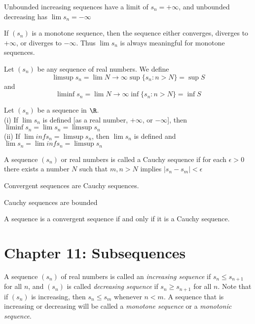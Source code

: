 \documentclass[twoside, 10pt]{article}
\begin{document}
\begin{thm}
Unbounded increasing sequences have a limit of $s_n = +\infty$, and unbounded decreasing has $\lim s_n = -\infty$
\end{thm}

\begin{cor}
If $(s_n)$ is a monotone sequence, then the sequence either converges, diverges to $+\infty$, or diverges to $-\infty$. Thus $\lim s_n$ is always meaningful for monotone sequences.
\end{cor}

\begin{defn}
Let $(s_n)$ be any sequence of real numbers. We define \begin{equation*}
    \limsup{s_n} = \lim\limits{N \to \infty} \sup \{s_n: n > N\} = \sup S
\end{equation*}
and 
\begin{equation*}
    \liminf{s_n} = \lim\limits{N \to \infty} \inf\{s_n : n > N\} = \inf S
\end{equation*}
\end{defn}

\begin{thm}
Let $(s_n)$ be a sequence in $\R$.\\
(i) If $\lim s_n$ is defined [as a real number, $+\infty$, or $-\infty$], then $\liminf s_n = \lim s_n = \limsup s_n$\\
(ii) If $\lim inf s_n = \limsup s_n$, then $\lim s_n$ is defined and $\lim s_n = \lim inf s_n = \limsup s_n$
\end{thm}

\begin{defn}
A sequence $(s_n)$ or real numbers is called a Cauchy sequence if for each $\epsilon > 0$ there exists a number $N$ such that $m, n > N$ implies $|s_n - s_m| < \epsilon$
\end{defn}

\begin{lem}
Convergent sequences are Cauchy sequences.
\end{lem}

\begin{lem}
Cauchy sequences are bounded
\end{lem}

\begin{thm}
A sequence is a convergent sequence if and only if it is a Cauchy sequence.
\end{thm}

\section*{Chapter 11: Subsequences}
\begin{defn}
A sequence $(s_n)$ of real numbers is called an \emph{increasing sequence} if $s_n\le s_{n+1}$ for all $n$, and $(s_n)$ is called \emph{decreasing sequence} if $s_n\ge s_{n+1}$ for all $n$. Note that if $(s_n)$ is increasing, then $s_n\le s_m$ whenever $n< m$. A sequence that is increasing or decreasing will be called a \emph{monotone sequence} or a \emph{monotonic sequence}.
\end{defn}
\end{document}
